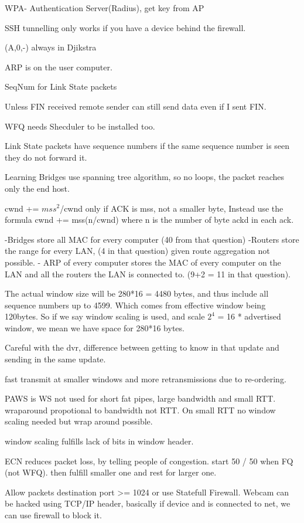 \documentclass[12pt]{book}
\begin{document}
WPA- Authentication Server(Radius), get key from AP

SSH tunnelling only works if you have a device behind the firewall.


(A,0,-) always in Djikstra

ARP is on the user computer.

SeqNum for Link State packets

Unless FIN received remote sender can still send data even if I sent FIN.

WFQ needs Shecduler to be installed too.

Link State packets have sequence numbers if the same sequence number is seen they do not forward it.

Learning Bridges use spanning tree algorithm, so no loops, the packet reaches only the end host.

cwnd += $mss^2$/cwnd
only if ACK is mss, not a smaller byte, Instead use the formula 
cwnd += mss(n/cwnd) where n is the number of byte ackd in each ack.

-Bridges store all MAC for every computer (40 from that question)
-Routers store the range for every LAN, (4 in that question) given route aggregation not possible.
- ARP of every computer stores the MAC of every computer on the LAN and all the routers the LAN is connected to. (9+2 = 11 in that question).

The actual window size will be 280*16 = 4480 bytes, and thus include all sequence numbers up to 4599. Which comes from effective window being 120bytes. So if we say window scaling is used, and scale $2^4$ = 16 * advertised window, we mean we have space for 280*16 bytes.

Careful with the dvr, difference between getting to know in that update and sending in the same update.

fast transmit at smaller windows and more retransmissions due to re-ordering.

PAWS is WS not used for short fat pipes, large bandwidth and small RTT. wraparound propotional to bandwidth not RTT. On small RTT no window scaling needed but wrap around possible.

window scaling fulfills lack of bits in window header.

ECN reduces packet loss, by telling people of congestion.
start 50 / 50 when FQ (not WFQ). then fulfill smaller one and rest for larger one.

Allow packets destination port >= 1024 or use Statefull Firewall.
Webcam can be hacked using TCP/IP header, basically if device and is connected to net, we can use firewall to block it.
\end{document}
